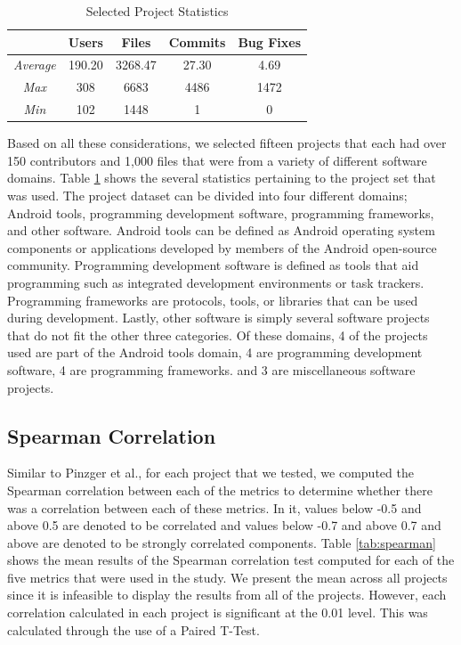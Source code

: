 \documentclass{sig-alternate-05-2015}
\begin{document}
\begin{table}
\centering
\caption{Selected Project Statistics}
\label{tab:proj_stats}
\begin{tabular}{|c|c|c|c|c|} \hline
&\textbf{Users}&\textbf{Files}&\textbf{Commits}&\textbf{Bug Fixes}\\ \hline
\textit{Average}&190.20&3268.47&27.30&4.69\\ \hline
\textit{Max}&308&6683&4486&1472\\ \hline
\textit{Min}&102&1448&1&0\\ \hline
\end{tabular}
\end{table}

Based on all these considerations, we selected fifteen projects that each had over 150 contributors and 1,000 files that were from a variety of different software domains. Table \ref{tab:proj_stats} shows the several statistics pertaining to the project set that was used. The project dataset can be divided into four different domains; Android tools, programming development software, programming frameworks, and other software. Android tools can be defined as Android operating system components or applications developed by members of the Android open-source community. Programming development software is defined as tools that aid programming such as integrated development environments or task trackers. Programming frameworks are protocols, tools, or libraries that can be used during development. Lastly, other software is simply several software projects that do not fit the other three categories. Of these domains, 4 of the projects used are part of the Android tools domain, 4 are programming development software, 4 are programming frameworks. and 3 are miscellaneous software projects.

\subsection{Spearman Correlation}
Similar to Pinzger et al., for each project that we tested, we computed the Spearman correlation between each of the metrics to determine whether there was a correlation between each of these metrics. In it, values below -0.5 and above 0.5 are denoted to be correlated and values below -0.7 and above 0.7 and above are denoted to be strongly correlated components. Table \ref{tab:spearman} shows the mean results of the Spearman correlation test computed for each of the five metrics that were used in the study. We present the mean across all projects since it is infeasible to display the results from all of the projects. However, each correlation calculated in each project is significant at the 0.01 level. This was calculated through the use of a Paired T-Test.
\end{document}
